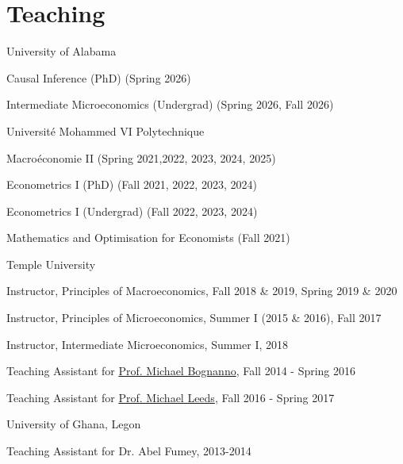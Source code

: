 \documentclass[12pt,letterpaper]{article}
\renewenvironment{itemize}{
  \begin{list}{}{
    \setlength{\leftmargin}{1.5em}
  }
}{
  \end{list}
}
\begin{document}
\section*{Teaching}
\begin{enumerate}
	\item University of Alabama
	\begin{itemize}
		\item Causal Inference (PhD) (Spring 2026)
		\item Intermediate Microeconomics (Undergrad) (Spring 2026, Fall 2026)
	\end{itemize}
	\item Universit\'e Mohammed VI Polytechnique
	\begin{itemize}
		\item Macro\'economie II (Spring 2021,2022, 2023, 2024, 2025)
		\item Econometrics I (PhD) (Fall 2021, 2022, 2023, 2024)
		\item Econometrics I (Undergrad) (Fall 2022, 2023, 2024)
		\item Mathematics and Optimisation for Economists (Fall 2021)
	\end{itemize}
	\item Temple University
	\begin{itemize}
		\item Instructor, Principles of Macroeconomics, Fall 2018 \& 2019, Spring 2019 \& 2020
		\item Instructor, Principles of Microeconomics, Summer I (2015 \& 2016), Fall 2017
		\item Instructor, Intermediate Microeconomics, Summer I, 2018
		\item Teaching Assistant for \href{https://liberalarts.temple.edu/academics/faculty/bognanno-michael}{Prof. Michael Bognanno}, Fall 2014 - Spring 2016
		\item Teaching Assistant for \href{https://liberalarts.temple.edu/academics/faculty/leeds-michael}{Prof. Michael Leeds}, Fall 2016 - Spring 2017
	\end{itemize}
	\item University of Ghana, Legon
	\begin{itemize}
		\item Teaching Assistant for Dr. Abel Fumey, 2013-2014
	\end{itemize}
\end{enumerate}
\end{document}
